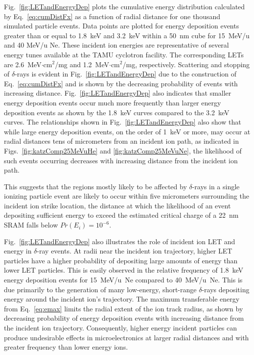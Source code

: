 Fig.~\ref{fig:LETandEnergyDep} plots the cumulative energy distribution calculated by Eq.~\ref{eq:cumDistFx} as a function of radial distance for one thousand simulated particle events. 
Data points are plotted for energy deposition events greater than or equal to 1.8~keV and 3.2~keV within a 50~nm cube for 15~MeV/u and 40 MeV/u Ne.
These incident ion energies are representative of several energy tunes available at the TAMU cyclotron facility.
The corresponding LETs are 2.6~MeV$\cdot$cm$^2$/mg and 1.2~MeV$\cdot$cm$^2$/mg, respectively.
Scattering and stopping of $\delta$-rays is evident in Fig.~\ref{fig:LETandEnergyDep} due to the construction of Eq.~\ref{eq:cumDistFx} and is shown by the decreasing probability of events with increasing distance. 
Fig.~\ref{fig:LETandEnergyDep} also indicates that smaller energy deposition events occur much more frequently than larger energy deposition events as shown by the 1.8~keV curves compared to the 3.2~keV curves.
The relationships shown in Fig.~\ref{fig:LETandEnergyDep} also show that while large energy deposition events, on the order of 1~keV or more, may occur at radial distances tens of micrometers from an incident ion path, as indicated in Figs.~\ref{fig:katzComp25MeVuHe} and \ref{fig:katzComp25MeVuNe}, the likelihood of such events occurring decreases with increasing distance from the incident ion path.

This suggests that the regions mostly likely to be affected by $\delta$-rays in a single ionizing particle event are likely to occur within five micrometers surrounding the incident ion strike location, the distance at which the likelihood of an event depositing sufficient energy to exceed the estimated critical charge of a 22~nm SRAM falls below $Pr(E_i) = 10^{-6}$.

Fig.~\ref{fig:LETandEnergyDep} also illustrates the role of incident ion LET and energy in $\delta$-ray events.
 At radii near the incident ion trajectory, higher LET particles have a higher probability of depositing large amounts of energy than lower LET particles.
 This is easily observed in the relative frequency of 1.8~keV energy deposition events for 15~MeV/u~Ne compared to 40~MeV/u~Ne.
 This is due primarily to the generation of many low-energy, short-range $\delta$-rays depositing energy around the incident ion's trajectory.
 The maximum transferable energy from Eq.~\ref{eq:emax} limits the radial extent of the ion track radius, as shown by decreasing probability of energy deposition events with increasing distance from the incident ion trajectory.
 Consequently, higher energy incident particles can produce undesirable effects in microelectronics at larger radial distances and with greater frequency than lower energy ions.

